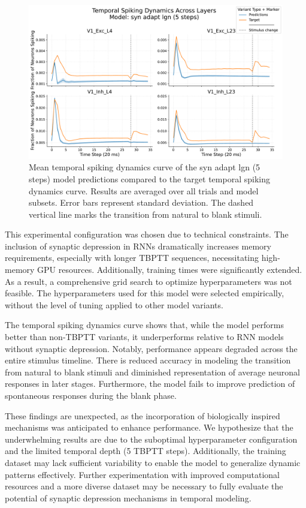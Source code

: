 \begin{figure}
    \centering
    \includegraphics[width=\linewidth]{img/plots/separate_model_synchrony_curve_syn_only_lgn_5_evaluation.pdf}
    \caption{Mean temporal spiking dynamics curve of the syn adapt lgn (5 steps) model predictions compared to the target temporal spiking dynamics curve. Results are averaged over all trials and model subsets. Error bars represent standard deviation. The dashed vertical line marks the transition from natural to blank stimuli.}
    \label{fig:synchrony_curve_syn_adapt_lgn_5}
\end{figure}

This experimental configuration was chosen due to technical constraints. The inclusion of synaptic depression in RNNs dramatically increases memory requirements, especially with longer TBPTT sequences, necessitating high-memory GPU resources. Additionally, training times were significantly extended. As a result, a comprehensive grid search to optimize hyperparameters was not feasible. The hyperparameters used for this model were selected empirically, without the level of tuning applied to other model variants.

The temporal spiking dynamics curve shows that, while the model performs better than non-TBPTT variants, it underperforms relative to RNN models without synaptic depression. Notably, performance appears degraded across the entire stimulus timeline. There is reduced accuracy in modeling the transition from natural to blank stimuli and diminished representation of average neuronal responses in later stages. Furthermore, the model fails to improve prediction of spontaneous responses during the blank phase.

These findings are unexpected, as the incorporation of biologically inspired mechanisms was anticipated to enhance performance. We hypothesize that the underwhelming results are due to the suboptimal hyperparameter configuration and the limited temporal depth (5 TBPTT steps). Additionally, the training dataset may lack sufficient variability to enable the model to generalize dynamic patterns effectively. Further experimentation with improved computational resources and a more diverse dataset may be necessary to fully evaluate the potential of synaptic depression mechanisms in temporal modeling.

